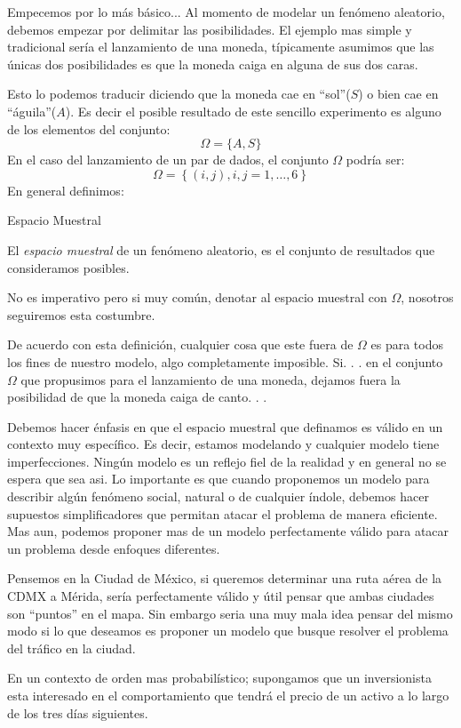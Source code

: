 \documentclass[a4paper,12pt,twoside]{libro}
\begin{document}
Empecemos por lo más básico... Al momento de modelar un fenómeno aleatorio, debemos empezar por delimitar las posibilidades. El ejemplo mas simple  y tradicional sería el lanzamiento de una moneda, típicamente asumimos que las únicas dos posibilidades es que la moneda caiga en alguna de sus dos caras.

Esto lo podemos traducir diciendo que la moneda cae en ``sol''($S$) o bien cae en ``águila''($A$). Es decir el posible resultado de este sencillo experimento es alguno de los elementos del conjunto: 
$$\Omega = \{A, S\}$$
%
En el caso del lanzamiento de un par de dados, el conjunto $\Omega$ podría ser: 
$$\Omega = \left\{(i , j), i , j = 1,\ldots , 6\right\}$$
%
En general definimos:

Espacio Muestral

El \emph{espacio muestral} de un fenómeno aleatorio, es el conjunto de resultados que consideramos posibles.

No es imperativo pero si muy común, denotar al espacio muestral con $\Omega$, nosotros seguiremos esta costumbre.

De acuerdo con esta definición, cualquier cosa que este fuera de $\Omega$ es para todos los fines de nuestro modelo, algo completamente imposible. Si. . . en el conjunto $\Omega$ que propusimos para el lanzamiento de una moneda, dejamos fuera la posibilidad de que la moneda caiga de canto. . .


Debemos hacer énfasis en que el espacio muestral que definamos es válido en un contexto muy específico. Es decir, estamos modelando y cualquier modelo tiene imperfecciones. Ningún modelo es un reflejo fiel de la realidad y en general no se espera que sea asi. Lo importante es que cuando proponemos un modelo para describir algún fenómeno social, natural o de cualquier índole, debemos hacer supuestos simplificadores que permitan atacar el problema de manera eficiente. Mas aun, podemos proponer mas de un modelo perfectamente válido para atacar un problema desde enfoques diferentes.

Pensemos en la Ciudad de México, si queremos determinar una ruta aérea de la CDMX a Mérida, sería perfectamente válido y útil pensar que ambas ciudades son ``puntos'' en el mapa. Sin embargo seria una muy mala idea pensar del mismo modo si lo que deseamos es proponer un modelo que busque resolver el problema del tráfico en la ciudad.

En un contexto de orden mas probabilístico; supongamos que un inversionista esta interesado en el comportamiento que tendrá el precio de un activo a lo largo de los tres días siguientes.
\end{document}
